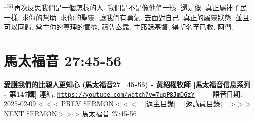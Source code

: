 \documentclass{book}
\begin{document}
$^{1361}$再次反思我們是一個怎樣的人.
我們是不是像他們一樣.
還是像.
真正屬神子民一樣.
求你的幫助.
求你的聖靈.
讓我們有勇氣.
去面對自己.
真正的屬靈狀態.
並且.
可以回歸.
常主你的真理的童從.
禱告奉靠.
主耶穌基督.
得聖名至已救.
阿們.
\newpage



\section{馬太福音 27:45-56}
\label{sec:7upP8JmD6zY}
\textbf{愛護我們的比親人更知心 (馬太福音27\_45-56) - 黃紹權牧師  [馬太福音信息系列 - 第147講]}
\newline
\newline
連結: \href{https://youtube.com/watch?v=7upP8JmD6zY}{\texttt{https://youtube.com/watch?v=7upP8JmD6zY}} ~~~~ 語音日期: 2025-02-09
\newline
\newline
\hyperref[sec:oCpi7n8ictU]{< < < PREV SERMON < < <}
~
\hyperlink{toc}{[返主目錄]}
~
\hyperref[ch:preacher16]{[返講員目錄]}
~
\hyperref[sec:MfR5_HAo14I]{> > > NEXT SERMON > > >}
\newline
\newline
馬太福音 27:45-56
\newline
\end{document}
